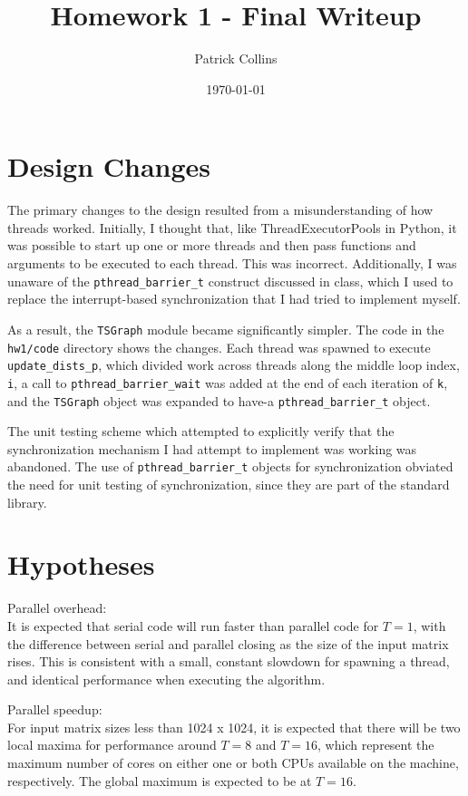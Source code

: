 \documentclass{article}
\begin{document}
\title{Homework 1 - Final Writeup}
\author{Patrick Collins}
\date{\today}
\maketitle

\section{Design Changes}
The primary changes to the design resulted from a misunderstanding of
how threads worked. Initially, I thought that, like
ThreadExecutorPools in Python, it was possible to start up one or more
threads and then pass functions and arguments to be executed to each
thread. This was incorrect. Additionally, I was unaware of the
\texttt{pthread\_barrier\_t} construct discussed in class, which I
used to replace the interrupt-based synchronization that I had tried
to implement myself. 

As a result, the \texttt{TSGraph} module became significantly
simpler. The code in the \texttt{hw1/code} directory shows the
changes. Each thread was spawned to execute \texttt{update\_dists\_p},
which divided work across threads along the middle loop index,
\texttt{i}, a call to \texttt{pthread\_barrier\_wait} was added at
the end of each iteration of \texttt{k}, and the \texttt{TSGraph}
object was expanded to have-a \texttt{pthread\_barrier\_t} object. 

The unit testing scheme which attempted to explicitly verify that the
synchronization mechanism I had attempt to implement was working was
abandoned. The use of \texttt{pthread\_barrier\_t} objects for
synchronization obviated the need for unit testing of synchronization,
since they are part of the standard library. 

\section{Hypotheses}
Parallel overhead: \\
It is expected that serial code will run faster
than parallel code for $T = 1$, with the difference between serial and
parallel closing as the size of the input matrix rises. This is
consistent with a small, constant slowdown for spawning a thread, and
identical performance when executing the algorithm.\bigskip

\noindent
Parallel speedup: \\
For input matrix sizes less than 1024 x 1024, it is expected that
there will be two local maxima for performance around  $T = 8$ and $T
= 16$, which represent the maximum number of cores on either one or
both CPUs available on the machine, respectively. The global maximum
is expected to be at $T = 16$. \smallskip
\end{document}
